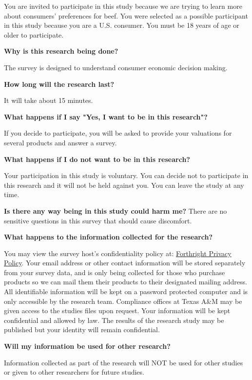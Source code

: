 \documentclass[12pt]{article}
\begin{document}
You are invited to participate in this study because we are trying to learn more about consumers' preferences for beef. You were selected as a possible participant in this study because you are a U.S. consumer. You must be 18 years of age or older to participate. \par
\textbf{Why is this research being done?} \par

The survey is designed to understand consumer economic decision making. \par

\textbf{How long will the research last?} \par
It will take about 15 minutes. \par
\textbf{What happens if I say "Yes, I want to be in this research"?} \par
If you decide to participate, you will be asked to provide your valuations for several products and answer a survey. \par


\textbf{
What happens if I do not want to be in this research?} \par
Your participation in this study is voluntary. You can decide not to participate in this research and it will not be held against you. You can leave the study at any time. \par

\textbf{Is there any way being in this study could harm me?}
There are no sensitive questions in this survey that should cause discomfort. \par

\textbf{What happens to the information collected for the research?} \par
You may view the survey host’s confidentiality policy at: \href{https://www.beforthright.com/privacy}{Forthright Privacy Policy}. Your email address or other contact information will be stored separately from your survey data, and is only being collected for those who purchase products so we can mail them their products to their designated mailing address. All identifiable information will be kept on a password protected computer and is only accessible by the research team. Compliance offices at Texas A\&M may be given access to the studies files upon request. Your information will be kept confidential and allowed by law. The results of the research study may be published but your identity will remain confidential. \par

\textbf{Will my information be used for other research?} \par
Information collected as part of the research will NOT be used for other studies or given to other researchers for future studies. \par
\end{document}
